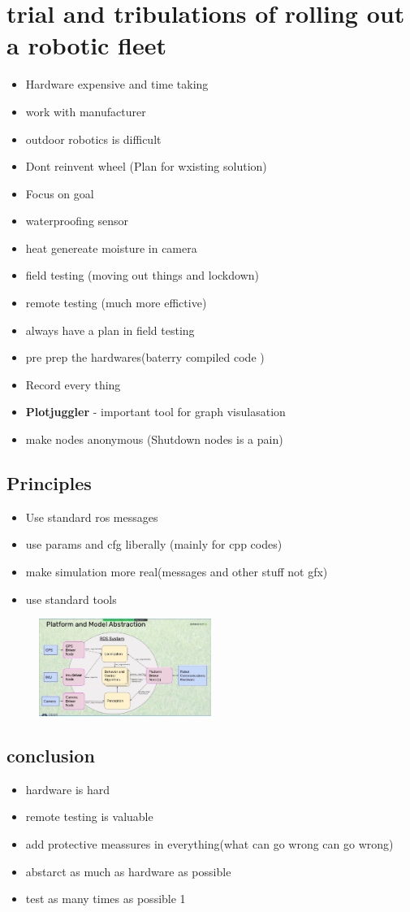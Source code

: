 \documentclass[a4paper]{article}
\begin{document}
\section{trial and tribulations of rolling out a robotic fleet}
\begin{itemize}
	\item Hardware expensive and time taking
	\item work with manufacturer
	\item outdoor robotics is difficult
	\item Dont reinvent wheel (Plan for wxisting solution)
	\item Focus on goal
	\item waterproofing sensor
	\item heat genereate moisture in camera
	\item field testing (moving out things and lockdown)
	\item remote testing (much more effictive)
	\item always have a plan in field testing
	\item pre prep the hardwares(baterry compiled code )
	\item Record every thing
	\item \textbf{Plotjuggler} - important tool for graph visulasation
	\item make nodes anonymous (Shutdown nodes is a pain)
\end{itemize}
\subsection{Principles}
\begin{itemize}
	\item Use standard ros messages
    \item use params and cfg liberally (mainly for cpp codes) 
    \item make simulation more real(messages and other stuff not gfx)
    \item use standard tools 
\end{itemize}
\begin{figure}[htpb]
	\centering
	\includegraphics[width=0.5\textwidth]{platform_abstraction.png}
	\caption{}
	\label{fig:}
\end{figure}
\subsection{conclusion}
\begin{itemize}
    \item hardware is hard 
    \item remote testing is valuable
    \item add protective meassures in everything(what can go wrong can go wrong)
    \item abstarct as much as hardware as possible
    \item test as many times as possible 1
\end{itemize}
\end{document}
